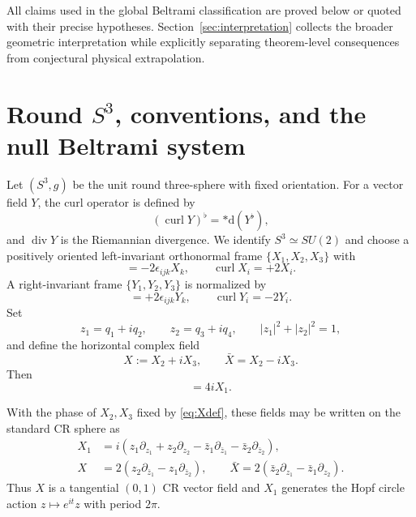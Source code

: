 \documentclass[aps,prd,reprint,nofootinbib,superscriptaddress]{revtex4-2}
\theoremstyle{definition}
\theoremstyle{remark}
\newcommand{\dd}{\mathrm{d}}
\newcommand{\Div}{\operatorname{div}}
\newcommand{\Curl}{\operatorname{curl}}
\begin{document}
All claims used in the global Beltrami classification are proved below or quoted with their precise hypotheses. Section~\ref{sec:interpretation} collects the broader geometric interpretation while explicitly separating theorem-level consequences from conjectural physical extrapolation.

\section{\texorpdfstring{Round $S^3$}{Round S3}, conventions, and the null Beltrami system}

Let $(S^3,g)$ be the unit round three-sphere with fixed orientation. For a vector field $Y$, the curl operator is defined by
\[
(\Curl Y)^\flat=*\dd(Y^\flat),
\]
and $\Div Y$ is the Riemannian divergence. We identify $S^3\simeq SU(2)$ and choose a positively oriented left-invariant orthonormal frame $\{X_1,X_2,X_3\}$ with
\begin{equation}
[X_i,X_j]=-2\epsilon_{ijk}X_k,
\qquad
\Curl X_i=+2X_i.
\label{eq:leftframe}
\end{equation}
A right-invariant frame $\{Y_1,Y_2,Y_3\}$ is normalized by
\begin{equation}
[Y_i,Y_j]=+2\epsilon_{ijk}Y_k,
\qquad
\Curl Y_i=-2Y_i.
\label{eq:rightframe}
\end{equation}
Set
\[
z_1=q_1+iq_2,\qquad z_2=q_3+iq_4,
\qquad |z_1|^2+|z_2|^2=1,
\]
and define the horizontal complex field
\begin{equation}
X:=X_2+iX_3,\qquad \bar X=X_2-iX_3.
\label{eq:Xdef}
\end{equation}
Then
\begin{equation}
[X,\bar X]=4iX_1.
\label{eq:Xcomm}
\end{equation}

With the phase of $X_2,X_3$ fixed by \eqref{eq:Xdef}, these fields may be written on the standard CR sphere as
\begin{align}
X_1&=i\!\left(z_1\partial_{z_1}+z_2\partial_{z_2}
-\bar z_1\partial_{\bar z_1}-\bar z_2\partial_{\bar z_2}\right),
\label{eq:X1coords}\\
X&=2\!\left(z_2\partial_{\bar z_1}-z_1\partial_{\bar z_2}\right),
\qquad
\bar X=2\!\left(\bar z_2\partial_{z_1}-\bar z_1\partial_{z_2}\right).
\label{eq:Xcoords}
\end{align}
Thus $X$ is a tangential $(0,1)$ CR vector field and $X_1$ generates the Hopf circle action $z\mapsto e^{it}z$ with period $2\pi$.
\end{document}
